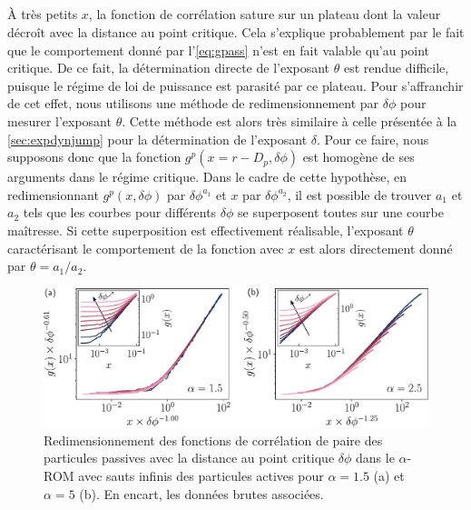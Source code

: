 \subparagraph{}\`A très petits $x$, la fonction de corrélation sature sur un plateau dont la valeur décroît avec la distance au point critique. Cela s'explique probablement par le fait que le comportement donné par l'\autoref{eq:gpass} n'est en fait valable qu'au point critique. De ce fait, la détermination directe de l'exposant $\theta$ est rendue difficile, puisque le régime de loi de puissance est parasité par ce plateau. Pour s'affranchir de cet effet, nous utilisons une méthode de redimensionnement par $\delta\phi$ pour mesurer l'exposant $\theta$. Cette méthode est alors très similaire à celle présentée à la \autoref{sec:expdynjump} pour la détermination de l'exposant $\delta$. Pour ce faire, nous supposons donc que la fonction $g^p(x=r-D_p, \delta\phi)$ est homogène de ses arguments dans le régime critique. Dans le cadre de cette hypothèse, en redimensionnant $g^p(x, \delta\phi)$ par $\delta\phi^{a_1}$ et $x$ par $\delta\phi^{a_2}$, il est possible de trouver $a_1$ et $a_2$ tels que les courbes pour différents $\delta\phi$ se superposent toutes sur une courbe maîtresse. Si cette superposition est effectivement réalisable, l'exposant $\theta$ caractérisant le comportement de la fonction avec $x$ est alors directement donné par $\theta = a_1/a_2$.

\begin{figure}[h]
	\centering
	\includegraphics[width=\textwidth]{Chapitre3/Figures/Interpretation/PCorr_alphaMF.pdf}
	\caption{Redimensionnement des fonctions de corrélation de paire des particules passives avec la distance au point critique $\delta\phi$ dans le $\alpha$-ROM avec sauts infinis des particules actives pour $\alpha = 1.5$ (a) et $\alpha=5$ (b). En encart, les données brutes associées. }
	\label{fig:PCorr_alphaMF}
\end{figure}

